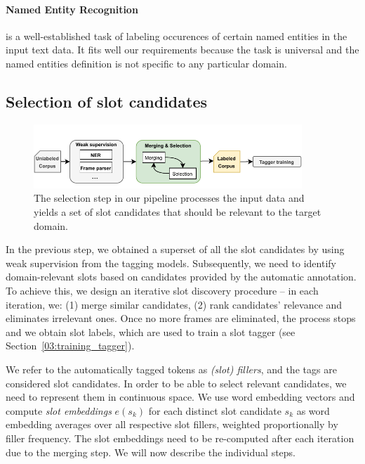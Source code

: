 \paragraph{Named Entity Recognition} is a well-established task of labeling occurences of certain named entities in the input text data.
It fits well our requirements because the task is universal and the named entities definition is not specific to any particular domain.
\subsection{Selection of slot candidates}
\label{03:candidate_selection}
\begin{figure}[ht]
    \centering
    \includegraphics[width=0.9\textwidth]{images/merging.pdf}
    \caption{The selection step in our pipeline processes the input data and yields a set of slot candidates that should be relevant to the target domain.}
    \label{fig:candidate_selection}
\end{figure}
In the previous step, we obtained a superset of all the slot candidates by using weak supervision from the tagging models.
Subsequently, we need to identify domain-relevant slots based on candidates provided by the automatic annotation.
To achieve this, we design an iterative slot discovery procedure -- in each iteration, we: 
(1) merge similar candidates, 
(2) rank candidates' relevance and eliminates irrelevant ones.
Once no more frames are eliminated, the process stops and we obtain slot labels, which are used to train a slot tagger (see Section~\ref{03:training_tagger}).

We refer to the automatically tagged tokens as \emph{(slot) fillers}, and the tags are considered slot candidates.
In order to be able to select relevant candidates, we need to represent them in continuous space.
We use word embedding vectors and compute \emph{slot embeddings} $e(s_k)$ for each 
distinct slot candidate $s_k$ as word embedding averages over all respective slot fillers, weighted proportionally by filler frequency.
The slot embeddings need to be re-computed after each iteration due to the merging step.
We will now describe the individual steps.

